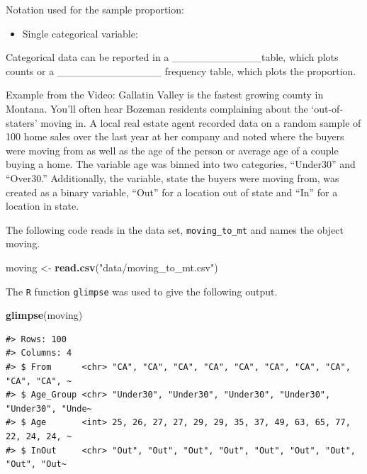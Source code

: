 \documentclass[
]{report}
\newenvironment{Shaded}{\begin{snugshade}}{\end{snugshade}}
\newcommand{\FunctionTok}[1]{\textcolor[rgb]{0.13,0.29,0.53}{\textbf{#1}}}
\newcommand{\NormalTok}[1]{#1}
\newcommand{\OtherTok}[1]{\textcolor[rgb]{0.56,0.35,0.01}{#1}}
\newcommand{\StringTok}[1]{\textcolor[rgb]{0.31,0.60,0.02}{#1}}
\providecommand{\tightlist}{%
  \setlength{\itemsep}{0pt}\setlength{\parskip}{0pt}}
\begin{document}
Notation used for the sample proportion:

\begin{itemize}
\tightlist
\item
  Single categorical variable:
\end{itemize}

\vspace{0.2in}


Categorical data can be reported in a \_\_\_\_\_\_\_\_\_\_\_\_table,
which plots counts or a \_\_\_\_\_\_\_\_\_\_\_\_\_\_
frequency table, which plots the proportion.


\vspace{2mm}

Example from the Video: Gallatin Valley is the fastest growing county in Montana. You'll often hear Bozeman residents complaining about the `out-of-staters' moving in. A local real estate agent recorded data on a random sample of 100 home sales over the last year at her company and noted where the buyers were moving from as well as the age of the person or average age of a couple buying a home. The variable age was binned into two categories, ``Under30'' and ``Over30.'' Additionally, the variable, state the buyers were moving from, was created as a binary variable, ``Out'' for a location out of state and ``In'' for a location in state.

The following code reads in the data set, \texttt{moving\_to\_mt} and names the object moving.

\begin{Shaded}
\begin{Highlighting}[]
\NormalTok{moving }\OtherTok{\textless{}{-}} \FunctionTok{read.csv}\NormalTok{(}\StringTok{"data/moving\_to\_mt.csv"}\NormalTok{)}
\end{Highlighting}
\end{Shaded}

The \texttt{R} function \texttt{glimpse} was used to give the following output.

\begin{Shaded}
\begin{Highlighting}[]
\FunctionTok{glimpse}\NormalTok{(moving)}
\end{Highlighting}
\end{Shaded}

\begin{verbatim}
#> Rows: 100
#> Columns: 4
#> $ From      <chr> "CA", "CA", "CA", "CA", "CA", "CA", "CA", "CA", "CA", "CA", ~
#> $ Age_Group <chr> "Under30", "Under30", "Under30", "Under30", "Under30", "Unde~
#> $ Age       <int> 25, 26, 27, 27, 29, 29, 35, 37, 49, 63, 65, 77, 22, 24, 24, ~
#> $ InOut     <chr> "Out", "Out", "Out", "Out", "Out", "Out", "Out", "Out", "Out~
\end{verbatim}
\end{document}
